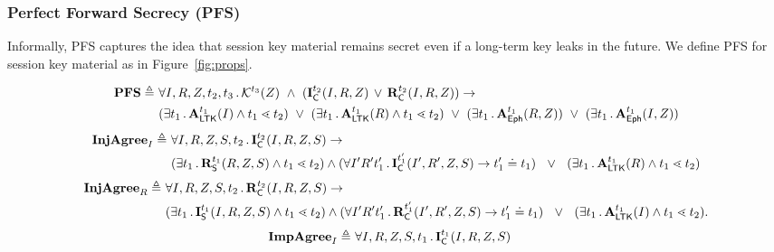 \subsubsection{Perfect Forward Secrecy (PFS)}
\label{sec:secrecy}
%
Informally, PFS captures the idea that session key material remains secret
even if a long-term key leaks in the future.
%
We define PFS for session key material \mSessKey{} as \mPredPfs{} in
Figure~\ref{fig:props}.
%

\begin{figure*}
\begin{align*}
    \mPredPfs \triangleq\ & \forall I, R, \mSessKey, t_2, t_3\mLogicDot
    \mK^{t_3}(\mSessKey)\  \land\ 
    (\mIComplete^{t_2}(I, R, \mSessKey)\, \lor\, \mRComplete^{t_2}(I, R, \mSessKey))
    \rightarrow\\
    &(\exists t_1\mLogicDot \mRevLTK^{t_1}(I) \land t_1 \lessdot t_2)
    \ \lor\ (\exists t_1\mLogicDot \mRevLTK^{t_1}(R) \land t_1 \lessdot t_2)
    \ \lor\ (\exists t_1\mLogicDot \mRevEph^{t_1}(R, \mSessKey))
    \ \lor\ (\exists t_1\mLogicDot \mRevEph^{t_1}(I, \mSessKey))
\end{align*}
\begin{align*}
    \mathbf{InjAgree}_I \triangleq\ &
    \forall I, R, Z, S, t_2\operatorname{.} \mathbf{I}_{\textsf{C}}^{t_2}(I, R, Z, S)
    \rightarrow\\
    &(\exists t_1\operatorname{.} \mathbf{R}_{\textsf{S}}^{t_1}(R, Z, S) \land t_1 \lessdot t_2)
    \land (\forall I' R' t_1' \operatorname{.} \mathbf{I}_{\textsf{C}}^{t_1'}(I' , R', Z, S)
        \rightarrow t_1' \doteq t_1)
    \ \ \lor\ \ (\exists t_1\operatorname{.} \mathbf{A}_{\textsf{LTK}}^{t_1}(R) \land t_1 \lessdot t_2)
\end{align*}
\begin{align*}
    \mathbf{InjAgree}_R \triangleq\ &
    \forall I, R, Z, S, t_2\operatorname{.} \mathbf{R}_{\textsf{C}}^{t_2}(I, R, Z, S)
    \rightarrow\\
    &(\exists t_1\operatorname{.} \mathbf{I}_{\textsf{S}}^{t_1}(I, R, Z, S) \land t_1 \lessdot t_2)
    \land (\forall I' R' t_1' \operatorname{.} \mathbf{R}_{\textsf{C}}^{t_1'}(I' , R', Z, S)
        \rightarrow t_1' \doteq t_1)
    \ \ \lor\ \ (\exists t_1\operatorname{.} \mathbf{A}_{\textsf{LTK}}^{t_1}(I) \land t_1 \lessdot t_2).
\end{align*}
\begin{align*}
    \mPredImpI \triangleq\ &
    \forall I, R, \mSessKey, S, t_1\mLogicDot \mIComplete^{t_1}(I, R, \mSessKey, S)

\end{align*}
\end{figure*}
